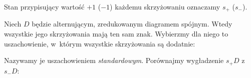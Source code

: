 \begin{definition}
    Stan przypisujący wartość $+1$ ($-1$) każdemu skrzyżowaniu oznaczamy $s_+$ ($s_-$).
\end{definition}

Niech $D$ będzie alternującym, zredukowanym diagramem spójnym.
Wtedy wszystkie jego skrzyżowania mają ten sam znak.
Wybierzmy dla niego to uszachowienie, w~którym wszystkie skrzyżowania są dodatnie:
\begin{comment}
\[
    \begin{tikzpicture}[baseline=-0.65ex,scale=0.15]
    \begin{knot}[clip width=5]
        \strand[thick] (-25, 0) to (25, 0);
        \strand[thick] (10*0-15, -5) to (10*0-15, -1);
        \strand[thick] (10*1-15, -5) to (10*1-15, -1);
        \strand[thick] (10*2-15, -5) to (10*2-15, -1);
        \strand[thick] (10*3-15, -5) to (10*3-15, -1);
        \strand[thick] (10*0-15, 1) to (10*0-15, 5);
        \strand[thick] (10*1-15, 1) to (10*1-15, 5);
        \strand[thick] (10*2-15, 1) to (10*2-15, 5);
        \strand[thick] (10*3-15, 1) to (10*3-15, 5);
        \draw[fill=diagramfiller,draw=none] (-25, 0) rectangle (-15, -5);
        \draw[fill=diagramfiller,draw=none] (-15, 0) rectangle (-5, 5);
        \draw[fill=diagramfiller,draw=none] (-5, 0) rectangle (5, -5);
        \draw[fill=diagramfiller,draw=none] (5, 0) rectangle (15, 5);
        \draw[fill=diagramfiller,draw=none] (15, 0) rectangle (25, -5);
        \node[above left] at (-15, 0) {$+1$};
        \node[above left] at (5, 0) {$+1$};
        \node[below left] at (-5, 0) {$+1$};
        \node[below left] at (15, 0) {$+1$};
    \end{knot}
    \end{tikzpicture}
\]
\end{comment}
Nazywamy je uszachowieniem \emph{standardowym}.
%
Porównajmy wygładzenie $s_+D$ z~$s_-D$:
